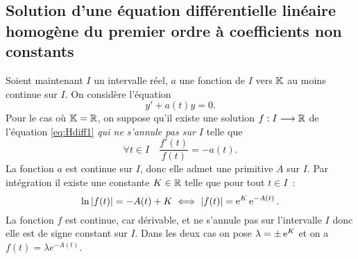 \subsection[Solution équation homogène coefficients non constants]{Solution d'une équation différentielle linéaire homogène du premier ordre à coefficients non constants}
Soient maintenant $I$ un intervalle réel, $a$ une fonction de $I$ vers $\mathbb{K}$ au moins continue sur $I$. On considère l'équation
\begin{equation}
y'+a(t)y=0 \label{eq:Hdiff1}.
\end{equation}
Pour le cas où $\mathbb{K}=\mathbb{R}$, on suppose qu'il existe une solution $f:I \longrightarrow \mathbb{R}$ de l'équation \eqref{eq:Hdiff1} \emph{qui ne s'annule pas sur $I$} telle que
\begin{equation}
\forall t \in I \quad \frac{f'(t)}{f(t)}=-a(t).
\end{equation}
La fonction $a$ est continue sur $I$, donc elle admet une primitive $A$ sur $I$. Par intégration il existe une constante $K \in \mathbb{R}$ telle que pour tout $t \in I$~:
\begin{equation}
\ln\left\lvert f(t)\right\rvert=-A(t) +K \iff \left\lvert f(t)\right\rvert=\operatorname{e}^K \operatorname{e}^{-A(t)}.
\end{equation}
La fonction $f$ est continue, car dérivable, et ne s'annule pas sur l'intervalle $I$ donc elle est de signe constant sur $I$. Dans les deux cas on pose $\lambda=\pm \operatorname{e}^K$ et on a $f(t)=\lambda e^{-A(t)}$. 

